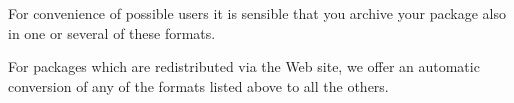For convenience of possible users it is sensible that you archive your
package also in one or several of these formats.

For packages which are redistributed via the {\GAP} Web site, we offer
an automatic conversion of any of  the formats listed above to all the
others.




